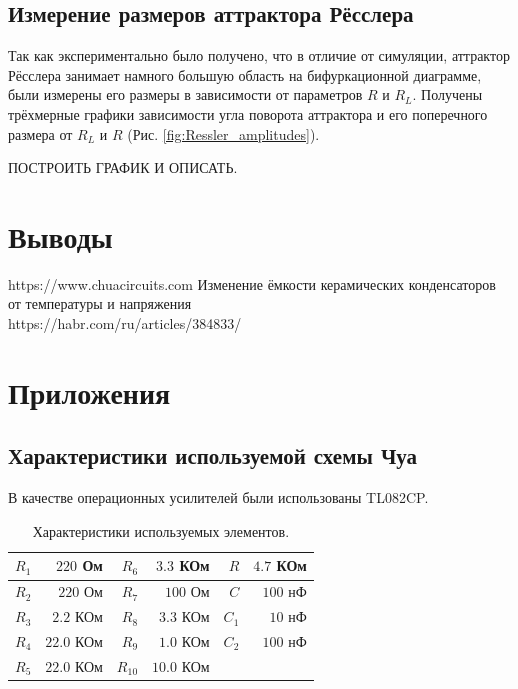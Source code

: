 \documentclass[12pt]{article}
\begin{document}
\subsection*{Измерение размеров аттрактора Рёсслера}
Так как экспериментально было получено, что в отличие от симуляции, аттрактор
Рёсслера занимает намного большую область на бифуркационной диаграмме, были измерены
его размеры в зависимости от параметров $R$ и $R_L$. Получены трёхмерные графики зависимости угла поворота аттрактора и
его поперечного размера от $R_L$ и $R$ (Рис. \ref{fig:Ressler_amplitudes}).

ПОСТРОИТЬ ГРАФИК И ОПИСАТЬ.


\section*{Выводы}

\begin{thebibliography}{9}
	https://www.chuacircuits.com
	Изменение ёмкости керамических конденсаторов от температуры и напряжения \\ https://habr.com/ru/articles/384833/
\end{thebibliography}

\section*{Приложения}
\subsection*{Характеристики используемой схемы Чуа}
В качестве операционных усилителей были использованы TL082CP.
\begin{table}[H]
	\centering
	\begin{tabular}{|r|r|r|r|r|r|}
		\hline
		$R_1$ & $220$ Ом   & $R_6$    & $3.3$ КОм  & $R$   & $4.7$ КОм \\ \hline
		$R_2$ & $220$ Ом   & $R_7$    & $100$ Ом   & $C$   & $100$ нФ  \\ \hline
		$R_3$ & $2.2$ КОм  & $R_8$    & $3.3$ КОм  & $C_1$ & $10$ нФ   \\ \hline
		$R_4$ & $22.0$ КОм & $R_9$    & $1.0$ КОм  & $C_2$ & $100$ нФ  \\ \hline
		$R_5$ & $22.0$ КОм & $R_{10}$ & $10.0$ КОм &       &           \\ \hline
	\end{tabular}
	\caption{Характеристики используемых элементов.}
	\label{tab:curcuit_chars}
\end{table}
\end{document}
